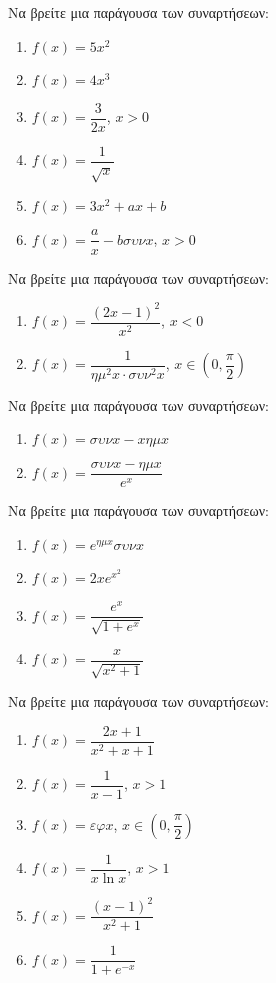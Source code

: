 \documentclass{presentation}
\begin{document}
\begin{askisi}
    Να βρείτε μια παράγουσα των συναρτήσεων:
    \begin{enumerate}[<+->]
        \item $f(x)=5x^2$
        \item $f(x)=4x^3$
        \item $f(x)=\dfrac{3}{2x}$, $x>0$
        \item $f(x)=\dfrac{1}{\sqrt{x}}$
        \item $f(x)=3x^2+ax+b$
        \item $f(x)=\dfrac{a}{x}-bσυνx$, $x>0$
    \end{enumerate}
\end{askisi}

\begin{askisi}
    Να βρείτε μια παράγουσα των συναρτήσεων:
    \begin{enumerate}[<+->]
        \item $f(x)=\dfrac{(2x-1)^2}{x^2}$, $x<0$
        \item $f(x)=\dfrac{1}{ημ^2x\cdot συν^2x}$, $x\in \left( 0,\dfrac{π}{2} \right) $
    \end{enumerate}
\end{askisi}

\begin{askisi}
    Να βρείτε μια παράγουσα των συναρτήσεων:
    \begin{enumerate}[<+->]
        \item $f(x)=συνx-xημx$
        \item $f(x)=\dfrac{συνx-ημx}{e^x}$
    \end{enumerate}
\end{askisi}

\begin{askisi}
    Να βρείτε μια παράγουσα των συναρτήσεων:
    \begin{enumerate}[<+->]
        \item $f(x)=e^{ημx}συνx$
        \item $f(x)=2xe^{x^2}$
        \item $f(x)=\dfrac{e^x}{\sqrt{1+e^x}}$
        \item $f(x)=\dfrac{x}{\sqrt{x^2+1}}$
    \end{enumerate}
\end{askisi}

\begin{askisi}
    Να βρείτε μια παράγουσα των συναρτήσεων:
    \begin{enumerate}[<+->]
        \item $f(x)=\dfrac{2x+1}{x^2+x+1}$
        \item $f(x)=\dfrac{1}{x-1}$, $x>1$
        \item $f(x)=εφx$, $x\in \left( 0,\dfrac{π}{2} \right) $
        \item $f(x)=\dfrac{1}{x\ln x}$, $x>1$
        \item $f(x)=\dfrac{(x-1)^2}{x^2+1}$
        \item $f(x)=\dfrac{1}{1+e^{-x}}$
    \end{enumerate}
\end{askisi}
\end{document}
